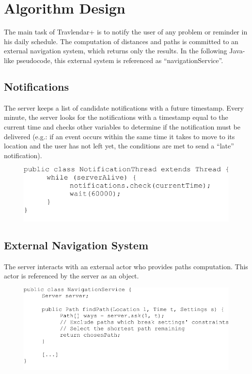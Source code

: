 \documentclass{article}
\begin{document}
	\section{Algorithm Design}
		\paragraph{}The main task of Travlendar+ is to notify the user of any problem or reminder in his daily schedule. The computation of distances and paths is committed to an external navigation system, which returns only the results. In the following Java-like pseudocode, this external system is referenced as “navigationService”.
		\subsection{Notifications}
			\paragraph{}The server keeps a list of candidate notifications with a future timestamp. Every minute, the server looks for the notifications with a timestamp equal to the current time and checks other variables to determine if the notification must be delivered (e.g.: if an event occurs within the same time it takes to move to its location and the user has not left yet, the conditions are met to send a “late” notification).\\ 
			\begin{figure}[H]
			\includegraphics[width=0.8\linewidth]{Algorithm_PDFs/NotificationThread-cropped.pdf}
			\caption{}
			\label{fig:C1}
			\end{figure}
		\subsection{External Navigation System}
			\paragraph{}The server interacts with an external actor who provides paths computation. This actor is referenced by the server as an object.
			\begin{figure}[H]
			\includegraphics[width=0.8\linewidth]{Algorithm_PDFs/NavigationService-cropped.pdf}
			\caption{}
			\label{fig:C2}
			\end{figure}
\end{document}
